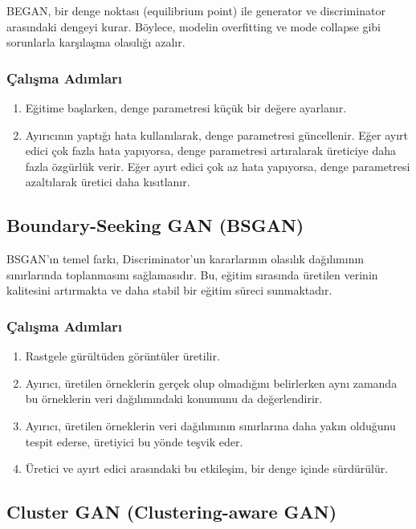 BEGAN, bir denge noktası (equilibrium point) ile generator ve discriminator arasındaki dengeyi kurar. Böylece, modelin overfitting ve mode collapse gibi sorunlarla karşılaşma olasılığı azalır. 

\subsubsection{Çalışma Adımları}

\begin{enumerate}
    \item Eğitime başlarken, denge parametresi küçük bir değere ayarlanır. 
    \item Ayırıcının yaptığı hata kullanılarak, denge parametresi güncellenir. Eğer ayırt edici çok fazla hata yapıyorsa, denge parametresi artıralarak üreticiye daha fazla özgürlük verir. Eğer ayırt edici çok az hata yapıyorsa, denge parametresi azaltılarak üretici daha kısıtlanır.
\end{enumerate}

\subsection{Boundary-Seeking GAN (BSGAN)}

BSGAN'ın temel farkı, Discriminator'un kararlarının olasılık dağılımının sınırlarında toplanmasını sağlamasıdır. Bu, eğitim sırasında üretilen verinin kalitesini artırmakta ve daha stabil bir eğitim süreci sunmaktadır.

\subsubsection{Çalışma Adımları}

\begin{enumerate}
    \item Rastgele gürültüden görüntüler üretilir.
    \item Ayırıcı, üretilen örneklerin gerçek olup olmadığını belirlerken aynı zamanda bu örneklerin veri dağılımındaki konumunu da değerlendirir.
    \item Ayırıcı, üretilen örneklerin veri dağılımının sınırlarına daha yakın olduğunu tespit ederse, üretiyici bu yönde teşvik eder.
    \item Üretici ve ayırt edici arasındaki bu etkileşim, bir denge içinde sürdürülür.
\end{enumerate}

\subsection{Cluster GAN (Clustering-aware GAN)}

